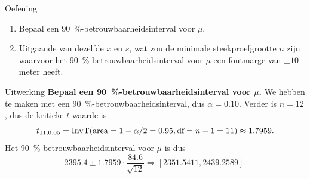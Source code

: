     \begin{frame}{Oefening}
        \begin{enumerate}
            \item Bepaal een \SI{90}{\percent}-betrouwbaarheidsinterval voor $\mu$.
            \item Uitgaande van dezelfde $\overline{x}$ en $s$, wat zou de minimale steekproefgrootte $n$ zijn waarvoor het \SI{90}{\percent}-betrouwbaarheidsinterval voor $\mu$ een foutmarge van $\pm 10$ meter heeft.
        \end{enumerate}
    \end{frame}

    \begin{frame}{Uitwerking}
        \textbf{Bepaal een \SI{90}{\percent}-betrouwbaarheidsinterval voor $\mu$.}
        \pause\vfill
        {\color{highlightcolor}
            We hebben te maken met een \SI{90}{\percent}-betrouwbaarheidsinterval, dus $\alpha=0.10$. 
            Verder is $n = 12$, dus de kritieke $t$-waarde is
            \[
                t_{11,0.05} = \operatorname{InvT}(\text{area}=1-\alpha/2=0.95, \text{df}=n-1=11) \approx 1.7959.
            \]
            Het \SI{90}{\percent}-betrouwbaarheidsinterval voor $\mu$ is dus
            \[
                2395.4 \pm 1.7959 \cdot \frac{84.6}{\sqrt{12}} \Rightarrow [2351.5411, 2439.2589].
            \]
        }
    \end{frame}

